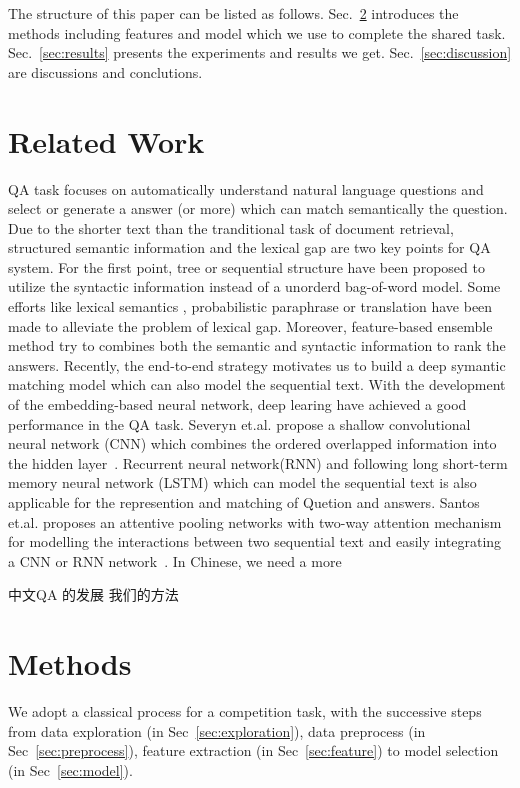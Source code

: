 \documentclass{llncs}
\begin{document}
The structure of this paper can be listed as follows. Sec.~\ref{sec:methods} introduces the methods including features and model which we use to complete the shared task. Sec.~\ref{sec:results}  presents the experiments and results we get. Sec.~\ref{sec:discussion} are discussions and conclutions.

\section{Related Work}

QA task focuses on automatically understand natural language questions and select or generate a answer (or more) which can match semantically the question. %
Due to the shorter text than the tranditional task of document retrieval, structured semantic information and  the lexical gap are two key points for QA system. 
For the first point, tree  \cite{Yao2013Answer} or sequential \cite{Wang2015FAQ} structure have been proposed to utilize the syntactic information instead of a  unorderd bag-of-word model.
Some efforts like lexical semantics \cite{Yih2013Question}, probabilistic paraphrase or translation \cite{Zhou2011Phrase} have been made to alleviate the problem of lexical gap.
Moreover, feature-based ensemble method \cite{Severyn2013Automatic} try to combines both the semantic and syntactic information to rank the answers. Recently, the end-to-end strategy motivates us to build a deep symantic matching model which can also model the sequential text. With the development of the embedding-based neural network, deep learing \cite{Yu2014Deep} \cite{Feng2015Applying} have achieved a good performance in the QA task. Severyn et.al. propose a shallow convolutional neural network (CNN) which combines the ordered overlapped information into the hidden layer~\cite{severyn2015learning}. Recurrent neural network(RNN) and following long short-term memory neural network (LSTM) \cite{Wang2015A} \cite{Tan2015LSTM} which can model the sequential text is also applicable for the represention and matching of Quetion and answers. Santos et.al. proposes an attentive pooling networks with two-way attention mechanism for modelling the interactions between two sequential text and easily integrating a CNN or RNN network~\cite{Santos2016Attentive}.
In Chinese, we need a more 


中文QA 的发展
我们的方法


\section{Methods}
\label{sec:methods}
We adopt a classical process for a competition task, with the successive steps from data exploration (in Sec~\ref{sec:exploration}), data preprocess (in Sec~\ref{sec:preprocess}), feature extraction (in Sec~\ref{sec:feature}) to model selection (in Sec~\ref{sec:model}).
\end{document}
